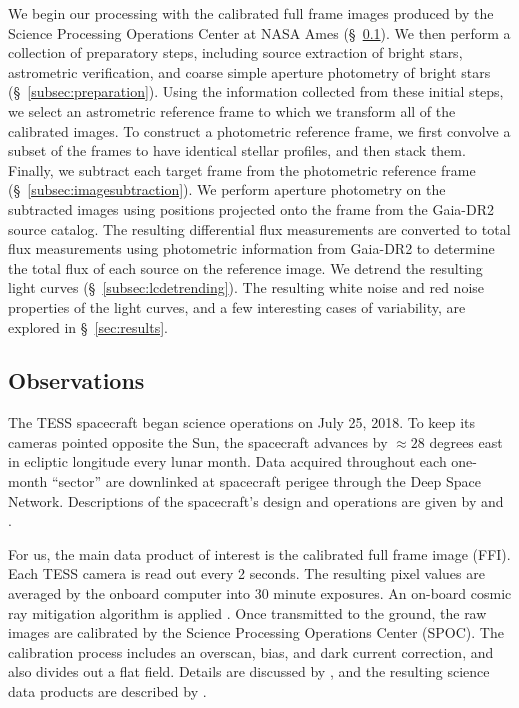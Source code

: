 \documentclass[12pt,twocolumn,tighten,trackchanges]{aastex62}
\begin{document}
We begin our processing with the calibrated full frame images produced
by the Science Processing Operations Center at NASA Ames
(\S~\ref{subsec:observations}).  We then perform a collection of
preparatory steps, including source extraction of bright stars,
astrometric verification, and coarse simple aperture photometry of
bright stars (\S~\ref{subsec:preparation}).  Using the information
collected from these initial steps, we select an astrometric reference
frame to which we transform all of the calibrated images.  To
construct a photometric reference frame, we first convolve a subset of
the frames to have identical stellar profiles, and then stack them.
Finally, we subtract each target frame from the photometric reference
frame (\S~\ref{subsec:imagesubtraction}).  We perform aperture
photometry on the subtracted images using positions projected onto the
frame from the Gaia-DR2 source catalog.  The resulting differential
flux measurements are converted to total flux measurements using
photometric information from Gaia-DR2 to determine the total flux of
each source on the reference image.  We detrend the resulting light
curves (\S~\ref{subsec:lcdetrending}).  The resulting white noise and
red noise properties of the light curves, and a few interesting cases
of variability, are explored in \S~\ref{sec:results}.


\subsection{Observations}
\label{subsec:observations}

The TESS spacecraft began science operations on July 25, 2018.  To
keep its cameras pointed opposite the Sun, the spacecraft advances by
$\approx$$28$ degrees east in ecliptic longitude every lunar month.
Data acquired throughout each one-month ``sector'' are downlinked at
spacecraft perigee through the Deep Space Network.  Descriptions of
the spacecraft's design and operations are given by
\citet{ricker_transiting_2015} and \citet{vanderspek_2018}.

For us, the main data product of interest is the calibrated full frame
image (FFI).  Each TESS camera is read out every 2 seconds.  The
resulting pixel values are averaged by the onboard computer into 30
minute exposures. An on-board cosmic ray mitigation algorithm is
applied \citep[][\S 5.1]{vanderspek_2018}. Once transmitted to the
ground, the raw images are calibrated by the Science Processing
Operations Center (SPOC).  The calibration process includes an
overscan, bias, and dark current correction, and also divides out a
flat field.  Details are discussed by \citet{clarke_kepler_2017}, and
the resulting science data products are described by
\citet{tess_data_product_description_2018}.
\end{document}
